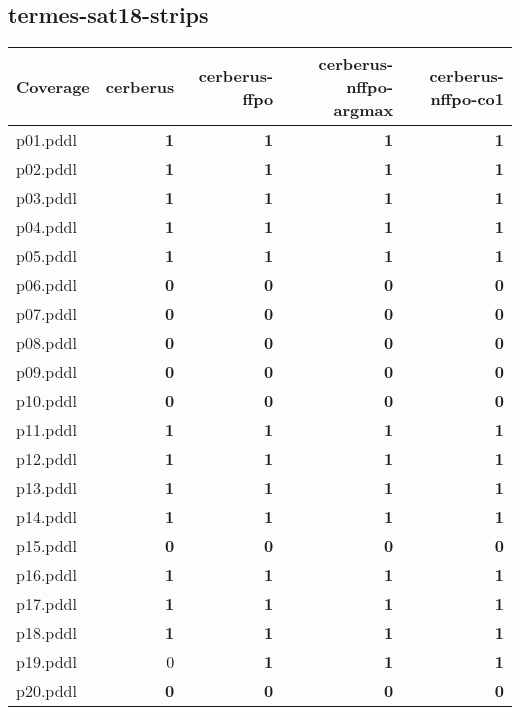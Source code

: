 \documentclass{article}
\begin{document}
\hypertarget{coverage-termes-sat18-strips}{}
\subsection*{termes-sat18-strips}

\begin{tabular}{@{}lrrrr@{}}
Coverage & cerberus & cerberus-ffpo & cerberus-nffpo-argmax & cerberus-nffpo-co1 \\
\midrule
p01.pddl & \textbf{1} & \textbf{1} & \textbf{1} & \textbf{1} \\
p02.pddl & \textbf{1} & \textbf{1} & \textbf{1} & \textbf{1} \\
p03.pddl & \textbf{1} & \textbf{1} & \textbf{1} & \textbf{1} \\
p04.pddl & \textbf{1} & \textbf{1} & \textbf{1} & \textbf{1} \\
p05.pddl & \textbf{1} & \textbf{1} & \textbf{1} & \textbf{1} \\
p06.pddl & \textbf{0} & \textbf{0} & \textbf{0} & \textbf{0} \\
p07.pddl & \textbf{0} & \textbf{0} & \textbf{0} & \textbf{0} \\
p08.pddl & \textbf{0} & \textbf{0} & \textbf{0} & \textbf{0} \\
p09.pddl & \textbf{0} & \textbf{0} & \textbf{0} & \textbf{0} \\
p10.pddl & \textbf{0} & \textbf{0} & \textbf{0} & \textbf{0} \\
p11.pddl & \textbf{1} & \textbf{1} & \textbf{1} & \textbf{1} \\
p12.pddl & \textbf{1} & \textbf{1} & \textbf{1} & \textbf{1} \\
p13.pddl & \textbf{1} & \textbf{1} & \textbf{1} & \textbf{1} \\
p14.pddl & \textbf{1} & \textbf{1} & \textbf{1} & \textbf{1} \\
p15.pddl & \textbf{0} & \textbf{0} & \textbf{0} & \textbf{0} \\
p16.pddl & \textbf{1} & \textbf{1} & \textbf{1} & \textbf{1} \\
p17.pddl & \textbf{1} & \textbf{1} & \textbf{1} & \textbf{1} \\
p18.pddl & \textbf{1} & \textbf{1} & \textbf{1} & \textbf{1} \\
p19.pddl & 0 & \textbf{1} & \textbf{1} & \textbf{1} \\
p20.pddl & \textbf{0} & \textbf{0} & \textbf{0} & \textbf{0} \\
\end{tabular}
\end{document}
